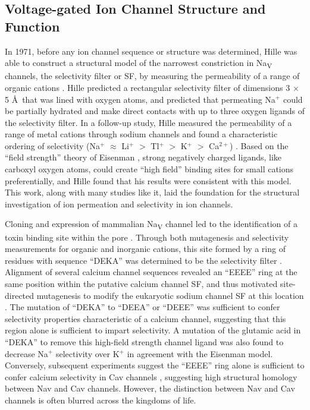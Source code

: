 \begin{refsection}
\section{Voltage-gated Ion Channel Structure and Function}

In 1971, before any ion channel sequence or structure was determined, Hille was able to construct a structural model of the narrowest constriction in Na\textsubscript{V} channels, the selectivity filter or SF, by measuring the permeability of a range of organic cations \cite{Hille:1972wz,Hille:1971vq}. Hille predicted a rectangular selectivity filter of dimensions 3 $\times$ 5 \AA\ that was lined with oxygen atoms, and predicted that permeating Na$^+$ could be partially hydrated and make direct contacts with up to three oxygen ligands of the selectivity filter.  In a follow-up study, Hille measured the permeability of a range of metal cations through sodium channels and found a characteristic ordering of selectivity (Na$^+$ $\approx$ Li$^+$ $>$ Tl$^+$ $>$ K$^+$ $>$ Ca$^{2+}$) \cite{Hille:1972wz,Eisenman:1962dy}. Based on the ``field strength'' theory of Eisenman \cite{Noda:1987gc,Eisenman:1983tc}, strong negatively charged ligands, like carboxyl oxygen atoms, could create ``high field'' binding sites for small cations preferentially, and Hille found that his results were consistent with this model. This work, along with many studies like it, laid the foundation for the structural investigation of ion permeation and selectivity in ion channels.

Cloning and expression of mammalian Na\textsubscript{V} channel led to the identification of a toxin binding site within the pore \cite{Noda:1986jn,Noda:1986ct,Terlau:1991ud,Noda:1989bj}. Through both mutagenesis and selectivity measurements for organic and inorganic cations, this site formed by a ring of residues with sequence ``DEKA'' was determined to be the selectivity filter \cite{Terlau:1991ud,Schlief:1996tb,Sun:1997uj}. Alignment of several calcium channel sequences revealed an ``EEEE'' ring at the same position within the putative calcium channel SF, and thus motivated site-directed mutagenesis to modify the eukaryotic sodium channel SF at this location \cite{Heinemann:1992ep}. The mutation of ``DEKA'' to ``DEEA'' or ``DEEE'' was sufficient to confer selectivity properties characteristic of a calcium channel, suggesting that this region alone is sufficient to impart selectivity. A mutation of the glutamic acid in ``DEKA'' to remove this high-field strength channel ligand was also found to decrease Na$^+$ selectivity over K$^+$ \cite{Favre:1996dg} in agreement with the Eisenman model. Conversely, subsequent experiments suggest the ``EEEE'' ring alone is sufficient to confer calcium selectivity in Cav channels \cite{Yang:1993ux,Ellinor:1995ky,Cibulsky:2000ix}, suggesting high structural homology between Nav and Cav channels. However, the distinction between Nav and Cav channels is often blurred across the kingdoms of life.


\end{refsection}
